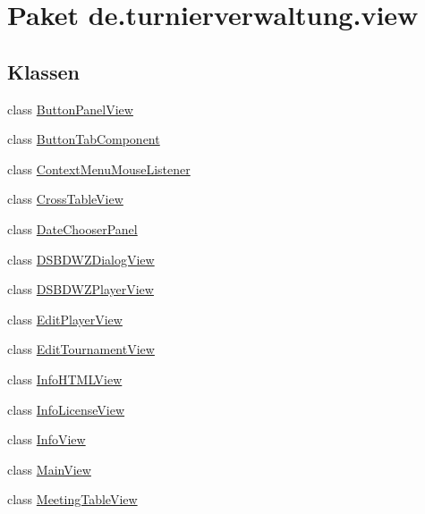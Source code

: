 \hypertarget{namespacede_1_1turnierverwaltung_1_1view}{}\section{Paket de.\+turnierverwaltung.\+view}
\label{namespacede_1_1turnierverwaltung_1_1view}
\subsection*{Klassen}
\begin{DoxyCompactItemize}
\item 
class \hyperlink{classde_1_1turnierverwaltung_1_1view_1_1_button_panel_view}{Button\+Panel\+View}
\item 
class \hyperlink{classde_1_1turnierverwaltung_1_1view_1_1_button_tab_component}{Button\+Tab\+Component}
\item 
class \hyperlink{classde_1_1turnierverwaltung_1_1view_1_1_context_menu_mouse_listener}{Context\+Menu\+Mouse\+Listener}
\item 
class \hyperlink{classde_1_1turnierverwaltung_1_1view_1_1_cross_table_view}{Cross\+Table\+View}
\item 
class \hyperlink{classde_1_1turnierverwaltung_1_1view_1_1_date_chooser_panel}{Date\+Chooser\+Panel}
\item 
class \hyperlink{classde_1_1turnierverwaltung_1_1view_1_1_d_s_b_d_w_z_dialog_view}{D\+S\+B\+D\+W\+Z\+Dialog\+View}
\item 
class \hyperlink{classde_1_1turnierverwaltung_1_1view_1_1_d_s_b_d_w_z_player_view}{D\+S\+B\+D\+W\+Z\+Player\+View}
\item 
class \hyperlink{classde_1_1turnierverwaltung_1_1view_1_1_edit_player_view}{Edit\+Player\+View}
\item 
class \hyperlink{classde_1_1turnierverwaltung_1_1view_1_1_edit_tournament_view}{Edit\+Tournament\+View}
\item 
class \hyperlink{classde_1_1turnierverwaltung_1_1view_1_1_info_h_t_m_l_view}{Info\+H\+T\+M\+L\+View}
\item 
class \hyperlink{classde_1_1turnierverwaltung_1_1view_1_1_info_license_view}{Info\+License\+View}
\item 
class \hyperlink{classde_1_1turnierverwaltung_1_1view_1_1_info_view}{Info\+View}
\item 
class \hyperlink{classde_1_1turnierverwaltung_1_1view_1_1_main_view}{Main\+View}
\item 
class \hyperlink{classde_1_1turnierverwaltung_1_1view_1_1_meeting_table_view}{Meeting\+Table\+View}

\end{DoxyCompactItemize}
